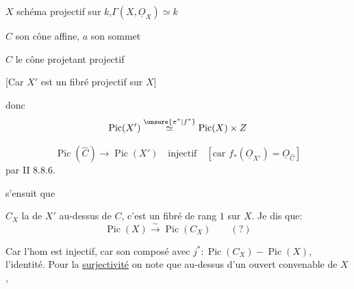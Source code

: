 
$X$ schéma projectif sur $k$,\qquad $\Gamma(X,\underline O_X)\simeq k$

$C$ son cône  affine, $a$ son sommet

$\hat C$ le cône projetant projectif


[Car $X'$ est un fibré projectif sur $X$]

donc
\[
\operatorname{Pic}(X')\overset{\unsure{\pi^*|f^*}}{\simeq}\operatorname{Pic}(X)\times Z
\]

\[
\operatorname{Pic}(\hat C)\longrightarrow\operatorname{Pic}(X')
\quad\text{injectif}\quad[\text{car }f_*(\underline O_{X'})=\underline O_{\hat C}]
\]
par II 8.8.6.

 s'ensuit que

 $C_X$ la  de $X'$ au-dessus de $C$,
c'est un fibré  de rang $1$ sur $X$.
Je dis que:
\[
\operatorname{Pic}(X)\overset{\sim}{\longrightarrow}\operatorname{Pic}(C_X)\qquad(?)
\]


Car l'hom est  injectif, car son composé avec
$j^*:\operatorname{Pic}(C_X)\mathbin{-}\operatorname{Pic}(X)$,
 l'identité. Pour la \uline{surjectivité} on note que au-dessus
d'un ouvert convenable de $X$,

